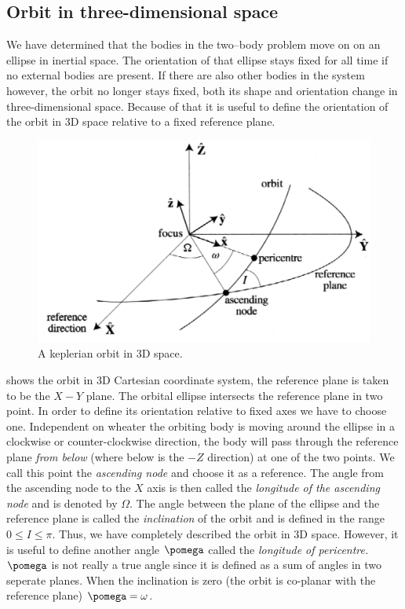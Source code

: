 \subsection{Orbit in three-dimensional space}
We have determined that the bodies in the two--body problem move on
on an ellipse in inertial space. The orientation of that ellipse 
stays fixed for all time if no external bodies are present. If there 
are also other bodies in the system however, the orbit no longer stays
fixed, both its shape and orientation change in three-dimensional space.
Because of that it is useful to define the orientation of the orbit
in 3D space relative to a fixed reference plane.
\begin{figure}[htb]
\centering
\includegraphics[width=0.8\linewidth]{gfx/3d_orbit.png}
\caption{A keplerian orbit in 3D space.}
\label{fig:3d_orbit}
\end{figure}
 shows the orbit in 3D Cartesian coordinate system,
the reference plane is taken to be the $X-Y$ plane. The orbital
ellipse intersects the reference plane in two point. In order to define
its orientation relative to fixed axes we have to choose one. Independent
on wheater the orbiting body is moving around the ellipse in a clockwise
or counter-clockwise direction, the body will pass through the reference
plane \emph{from below} (where below is the $-Z$ direction)
at one of the two points. We call this point the \emph{ascending node}
and choose it as a reference. The angle from the ascending node to the
$X$ axis is then called the \emph{longitude of the ascending node} and
is denoted by $\Omega$. The angle between the plane of the ellipse and
the reference plane is called the \emph{inclination} of the orbit and
is defined in the range $0\leq I\leq \pi$.
Thus, we have completely described the orbit in 3D space. However, it is useful to 
define another angle $\pomega$ called the \emph{longitude of pericentre.} 
$\pomega$ is not really a true angle since it is defined as a sum of 
angles in two seperate planes. When the inclination is zero (the orbit
is co-planar with the reference plane) $\pomega=\omega$. 

